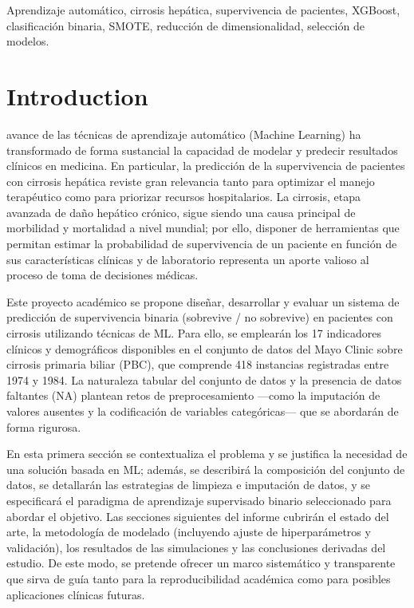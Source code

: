 \documentclass[journal]{IEEEtai}
\begin{document}
\begin{IEEEkeywords}
Aprendizaje automático, cirrosis hepática, supervivencia de pacientes, XGBoost, clasificación binaria, SMOTE, reducción de dimensionalidad, selección de modelos.
\end{IEEEkeywords}

\section{Introduction}

 avance de las técnicas de aprendizaje automático (Machine Learning) ha transformado de forma sustancial la capacidad de modelar y predecir resultados clínicos en medicina. En particular, la predicción de la supervivencia de pacientes con cirrosis hepática reviste gran relevancia tanto para optimizar el manejo terapéutico como para priorizar recursos hospitalarios. La cirrosis, etapa avanzada de daño hepático crónico, sigue siendo una causa principal de morbilidad y mortalidad a nivel mundial; por ello, disponer de herramientas que permitan estimar la probabilidad de supervivencia de un paciente en función de sus características clínicas y de laboratorio representa un aporte valioso al proceso de toma de decisiones médicas.

Este proyecto académico se propone diseñar, desarrollar y evaluar un sistema de predicción de supervivencia binaria (sobrevive / no sobrevive) en pacientes con cirrosis utilizando técnicas de ML. Para ello, se emplearán los 17 indicadores clínicos y demográficos disponibles en el conjunto de datos del Mayo Clinic sobre cirrosis primaria biliar (PBC), que comprende 418 instancias registradas entre 1974 y 1984. La naturaleza tabular del conjunto de datos y la presencia de datos faltantes (NA) plantean retos de preprocesamiento —como la imputación de valores ausentes y la codificación de variables categóricas— que se abordarán de forma rigurosa.

En esta primera sección se contextualiza el problema y se justifica la necesidad de una solución basada en ML; además, se describirá la composición del conjunto de datos, se detallarán las estrategias de limpieza e imputación de datos, y se especificará el paradigma de aprendizaje supervisado binario seleccionado para abordar el objetivo. Las secciones siguientes del informe cubrirán el estado del arte, la metodología de modelado (incluyendo ajuste de hiperparámetros y validación), los resultados de las simulaciones y las conclusiones derivadas del estudio. De este modo, se pretende ofrecer un marco sistemático y transparente que sirva de guía tanto para la reproducibilidad académica como para posibles aplicaciones clínicas futuras.
\end{document}
